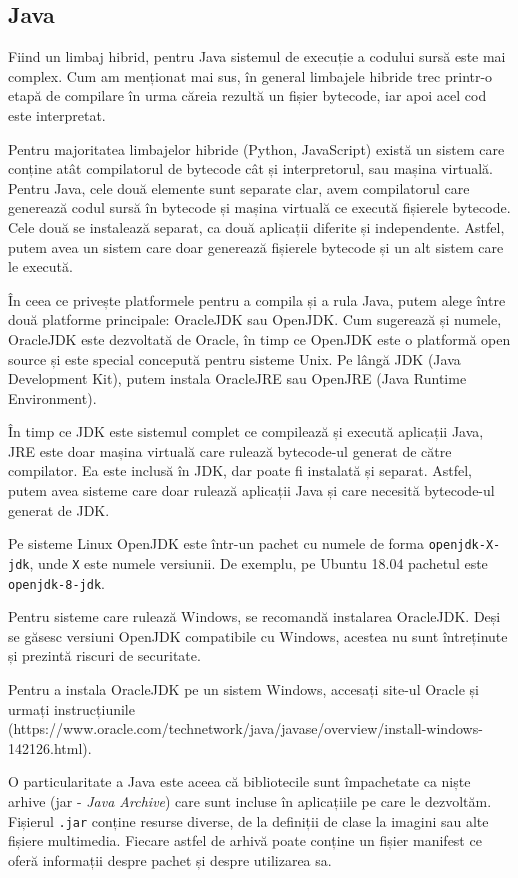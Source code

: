 \subsection{Java}
\label{sec:appdev:dev-env:java}

Fiind un limbaj hibrid, pentru Java sistemul de execuție a codului sursă este
mai complex. Cum am menționat mai sus, în general limbajele hibride trec
printr-o etapă de compilare în urma căreia rezultă un fișier bytecode, iar apoi
acel cod este interpretat.

Pentru majoritatea limbajelor hibride (Python, JavaScript) există un sistem care
conține atât compilatorul de bytecode cât și interpretorul, sau mașina virtuală.
Pentru Java, cele două elemente sunt separate clar, avem compilatorul care
generează codul sursă în bytecode și mașina virtuală ce execută fișierele
bytecode. Cele două se instalează separat, ca două aplicații diferite și
independente. Astfel, putem avea un sistem care doar generează fișierele
bytecode și un alt sistem care le execută.

În ceea ce privește platformele pentru a compila și a rula Java, putem alege
între două platforme principale: OracleJDK sau OpenJDK. Cum sugerează și numele,
OracleJDK este dezvoltată de Oracle, în timp ce OpenJDK este o platformă open
source și este special concepută pentru sisteme Unix. Pe lângă JDK (Java
Development Kit), putem instala OracleJRE sau OpenJRE (Java Runtime
Environment).

În timp ce JDK este sistemul complet ce compilează și execută aplicații Java,
JRE este doar mașina virtuală care rulează bytecode-ul generat de către
compilator. Ea este inclusă în JDK, dar poate fi instalată și separat. Astfel,
putem avea sisteme care doar rulează aplicații Java și care necesită bytecode-ul
generat de JDK.

Pe sisteme Linux OpenJDK este într-un pachet cu numele de forma \texttt{openjdk-X-jdk}, unde \texttt{X} este numele versiunii. De exemplu, pe Ubuntu 18.04 pachetul este \texttt{openjdk-8-jdk}.

Pentru sisteme care rulează Windows, se recomandă instalarea OracleJDK. Deși se
găsesc versiuni OpenJDK compatibile cu Windows, acestea nu sunt întreținute și
prezintă riscuri de securitate.

Pentru a instala OracleJDK pe un sistem Windows, accesați site-ul Oracle și
urmați instrucțiunile
(https://www.oracle.com/technetwork/java/javase/overview/install-windows-142126.html).

O particularitate a Java este aceea că bibliotecile sunt împachetate ca niște
arhive (jar - \textit{Java Archive}) care sunt incluse în aplicațiile pe care le
dezvoltăm. Fișierul \texttt{.jar} conține resurse diverse, de la definiții de clase la
imagini sau alte fișiere multimedia. Fiecare astfel de arhivă poate conține un
fișier manifest ce oferă informații despre pachet și despre utilizarea sa.

